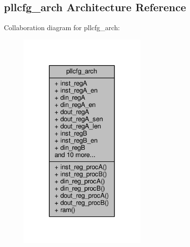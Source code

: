 \subsection{pllcfg\+\_\+arch Architecture Reference}
\label{classpllcfg_1_1pllcfg__arch}


Collaboration diagram for pllcfg\+\_\+arch\+:\nopagebreak
\begin{figure}[H]
\begin{center}
\leavevmode
\includegraphics[width=180pt]{d6/de1/classpllcfg_1_1pllcfg__arch__coll__graph}
\end{center}
\end{figure}
